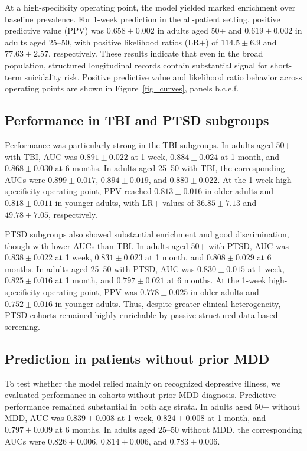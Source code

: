 \documentclass[onecolumn, compsoc,11pt]{IEEEtran}
\begin{document}
At a high-specificity operating point, the model yielded marked enrichment over baseline prevalence. For 1-week prediction in the all-patient setting, positive predictive value (PPV) was $0.658 \pm 0.002$ in adults aged 50+ and $0.619 \pm 0.002$ in adults aged 25--50, with positive likelihood ratios (LR$+$) of $114.5 \pm 6.9$ and $77.63 \pm 2.57$, respectively. These results indicate that even in the broad population, structured longitudinal records contain substantial signal for short-term suicidality risk.
Positive predictive value and likelihood ratio behavior across operating points are shown in Figure~\ref{fig_curves}, panels b,c,e,f.

\subsection*{Performance in TBI and PTSD subgroups}
Performance was particularly strong in the TBI subgroups. In adults aged 50+ with TBI, AUC was $0.891 \pm 0.022$ at 1 week, $0.884 \pm 0.024$ at 1 month, and $0.868 \pm 0.030$ at 6 months. In adults aged 25--50 with TBI, the corresponding AUCs were $0.899 \pm 0.017$, $0.894 \pm 0.019$, and $0.880 \pm 0.022$. At the 1-week high-specificity operating point, PPV reached $0.813 \pm 0.016$ in older adults and $0.818 \pm 0.011$ in younger adults, with LR$+$ values of $36.85 \pm 7.13$ and $49.78 \pm 7.05$, respectively.

PTSD subgroups also showed substantial enrichment and good discrimination, though with lower AUCs than TBI. In adults aged 50+ with PTSD, AUC was $0.838 \pm 0.022$ at 1 week, $0.831 \pm 0.023$ at 1 month, and $0.808 \pm 0.029$ at 6 months. In adults aged 25--50 with PTSD, AUC was $0.830 \pm 0.015$ at 1 week, $0.825 \pm 0.016$ at 1 month, and $0.797 \pm 0.021$ at 6 months. At the 1-week high-specificity operating point, PPV was $0.778 \pm 0.025$ in older adults and $0.752 \pm 0.016$ in younger adults. Thus, despite greater clinical heterogeneity, PTSD cohorts remained highly enrichable by passive structured-data-based screening.

\subsection*{Prediction in patients without prior MDD}

To test whether the model relied mainly on recognized depressive illness, we evaluated performance in cohorts without prior MDD diagnosis. Predictive performance remained substantial in both age strata. In adults aged 50+ without MDD, AUC was $0.839 \pm 0.008$ at 1 week, $0.824 \pm 0.008$ at 1 month, and $0.797 \pm 0.009$ at 6 months. In adults aged 25--50 without MDD, the corresponding AUCs were $0.826 \pm 0.006$, $0.814 \pm 0.006$, and $0.783 \pm 0.006$.
\end{document}
